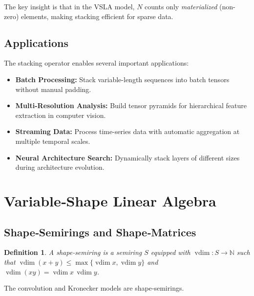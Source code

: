 \documentclass[11pt]{article}
\newtheorem{definition}[theorem]{Definition}
\newcommand{\vdim}{\operatorname{vdim}}
\begin{document}
The key insight is that in the VSLA model, $N$ counts only \emph{materialized} (non-zero) elements, making stacking efficient for sparse data.

\subsection{Applications}

The stacking operator enables several important applications:

\begin{itemize}
\item \textbf{Batch Processing:} Stack variable-length sequences into batch tensors without manual padding.
\item \textbf{Multi-Resolution Analysis:} Build tensor pyramids for hierarchical feature extraction in computer vision.
\item \textbf{Streaming Data:} Process time-series data with automatic aggregation at multiple temporal scales.
\item \textbf{Neural Architecture Search:} Dynamically stack layers of different sizes during architecture evolution.
\end{itemize}

\section{Variable‑Shape Linear Algebra}
\label{sec:vsla}
\subsection{Shape‑Semirings and Shape‑Matrices}
\begin{definition}
A \emph{shape‑semiring} is a semiring $S$ equipped with $\vdim\colon S\to\mathbb N$ such that $\vdim(x+y)\le\max\{\vdim x,\vdim y\}$ and $\vdim(xy)=\vdim x\,\vdim y$.
\end{definition}

The convolution and Kronecker models are shape‑semirings.
\end{document}
